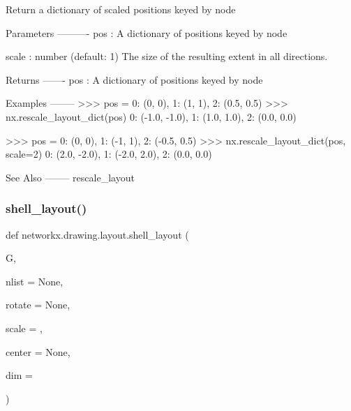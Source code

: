 \begin{DoxyVerb}Return a dictionary of scaled positions keyed by node

Parameters
----------
pos : A dictionary of positions keyed by node

scale : number (default: 1)
    The size of the resulting extent in all directions.

Returns
-------
pos : A dictionary of positions keyed by node

Examples
--------
>>> pos = {0: (0, 0), 1: (1, 1), 2: (0.5, 0.5)}
>>> nx.rescale_layout_dict(pos)
{0: (-1.0, -1.0), 1: (1.0, 1.0), 2: (0.0, 0.0)}

>>> pos = {0: (0, 0), 1: (-1, 1), 2: (-0.5, 0.5)}
>>> nx.rescale_layout_dict(pos, scale=2)
{0: (2.0, -2.0), 1: (-2.0, 2.0), 2: (0.0, 0.0)}

See Also
--------
rescale_layout
\end{DoxyVerb}
 \mbox{\label{namespacenetworkx_1_1drawing_1_1layout_afda61265a93a6d2ff4f19c624723d387}} 
\subsubsection{\texorpdfstring{shell\+\_\+layout()}{shell\_layout()}}
{\footnotesize\ttfamily def networkx.\+drawing.\+layout.\+shell\+\_\+layout (\begin{DoxyParamCaption}\item[{}]{G,  }\item[{}]{nlist = {\ttfamily None},  }\item[{}]{rotate = {\ttfamily None},  }\item[{}]{scale = {},  }\item[{}]{center = {\ttfamily None},  }\item[{}]{dim = {} }\end{DoxyParamCaption})}

